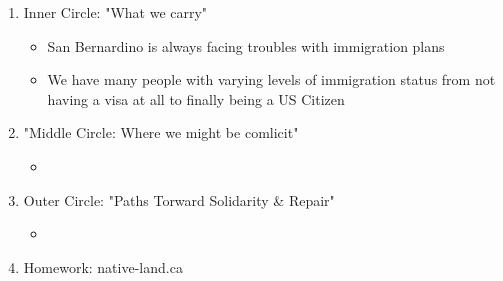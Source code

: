 \documentclass{article}
\begin{document}
  \begin{enumerate}
    \item Inner Circle: "What we carry"
      \begin{itemize}
        \item San Bernardino is always facing troubles with immigration plans
          \item We have many people with varying levels of immigration status from not having a
          visa at all to finally being a US Citizen

      \end{itemize}

    \item "Middle Circle: Where we might be comlicit"
      \begin{itemize}
        \item 
      \end{itemize}

    \item Outer Circle: "Paths Torward Solidarity \& Repair"
      \begin{itemize}
        \item 
      \end{itemize}
    \item Homework: native-land.ca
  \end{enumerate}
\end{document}
